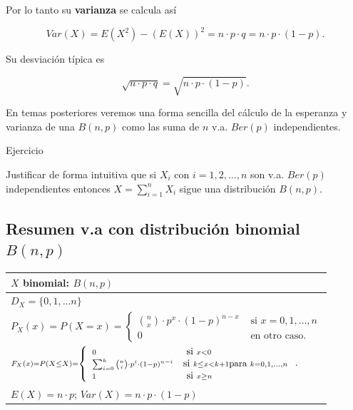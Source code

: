 \documentclass[
  letterpaper,
  DIV=11,
  numbers=noendperiod]{scrreprt}
\begin{document}
Por lo tanto su \textbf{varianza} se calcula así

\[Var(X)=E(X^2)-\left(E(X)\right)^2=n\cdot p \cdot q=n\cdot p\cdot (1-p).\]

Su desviación típica es

\[\sqrt{n\cdot p\cdot q}=\sqrt{n\cdot p\cdot (1-p)}.\]

En temas posteriores veremos una forma sencilla del cálculo de la
esperanza y varianza de una \(B(n,p)\) como las suma de \(n\) v.a.
\(Ber(p)\) independientes.

Ejercicio

Justificar de forma intuitiva que si \(X_i\) con \(i=1,2,\ldots, n\) son
v.a. \(Ber(p)\) independientes entonces
\(X=\displaystyle\sum_{i=1}^n X_i\) sigue una distribución \(B(n,p).\)

\subsection{\texorpdfstring{Resumen v.a con distribución binomial
\(B(n,p)\)}{Resumen v.a con distribución binomial B(n,p)}}\label{resumen-v.a-con-distribuciuxf3n-binomial-bnp}

\renewcommand{\arraystretch}{1.75}
\begin{table}
\centering
\begin{tabular}{|l|}
\hline\rowcolor{LightBlue}
$X$ binomial:   $B(n,p)$ \\\hline
$\scriptstyle  D_X=   \{0,1,\ldots n\}$  \\\hline
$\scriptstyle P_X(x)=P(X=x)=\left\{\begin{array}{ll}\scriptstyle {n\choose x}\cdot  p^x\cdot  (1-p)^{n-x} & \mbox{ si } x=0,1,\ldots,n\\0  & \mbox{ en otro caso.}\end{array}\right.$ \\\hline
$\scriptstyle  F_X(x)=P(X\leq X)=
\scriptstyle\left\{
\begin{array}{ll}
\scriptstyle  0 & \scriptstyle  \mbox{ si } x<0\\ 
\scriptstyle \sum_{i=0}^k {n\choose i}\cdot  p^i\cdot  (1-p)^{n-i} &  
\scriptstyle \mbox{si } \scriptstyle k\leq x< k+1 \mbox{\small para } \scriptstyle k=0,1,\dots,n \\ 
\scriptstyle 1 & \scriptstyle  \mbox{ si } x\geq n
\end{array}
\right.$.\\\hline
$\scriptstyle E(X)=n\cdot p$; $\scriptstyle  Var(X)=n\cdot p \cdot (1-p)$ \\\hline
\end{tabular}
\end{table}
\end{document}
